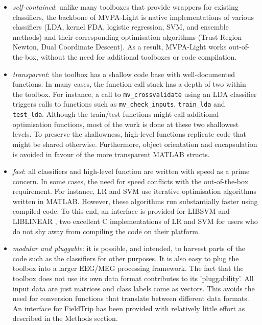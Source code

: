 \documentclass[utf8]{frontiersSCNS} %
\begin{document}

\begin{itemize}
\item \textit{self-contained}: unlike many toolboxes that provide wrappers for existing classifiers, the backbone of MVPA-Light is  native implementations of various classifiers (LDA, kernel FDA, logistic regression, SVM, and ensemble methods) and their corresponding optimisation algorithms (Trust-Region Newton, Dual Coordinate Descent). As a result, MVPA-Light works out-of-the-box, without the need for additional toolboxes or  code compilation.
\item \textit{transparent}: the toolbox has a shallow code base with well-documented functions. In many cases, the function call stack has a depth of two within the toolbox. For instance, a call to \texttt{mv\_crossvalidate} using an LDA classifier triggers calls to functions such as  \texttt{mv\_check\_inputs}, \texttt{train\_lda} and \texttt{test\_lda}. Although the train/test functions might call additional optimisation functions, most of the work is done at these two shallowest levels. To preserve the shallowness, high-level functions replicate code that might be shared otherwise. Furthermore, object orientation and encapsulation is avoided in favour of the more transparent MATLAB structs.
\item \textit{fast}: all classifiers and high-level function are written with speed as a prime concern. In some cases, the need for speed conflicts with the out-of-the-box requirement. For instance, LR and SVM use iterative optimisation algorithms written in MATLAB. However, these algorithms run substantially faster using compiled code. To this end, an interface is provided for LIBSVM \citep{Chang2011LIBSVM:Machines} and LIBLINEAR \citep{Fan2008}, two excellent C implementations of LR and SVM for users who do not shy away from compiling the code on their platform.
\item \textit{modular and pluggable}: it is possible, and intended, to harvest parts of the code such as the classifiers for other purposes. It is also easy to plug the toolbox into a larger EEG/MEG processing framework. The fact that the toolbox does not use its own data format contributes to its 'pluggability'. All input data are just matrices and class labels come as vectors. This avoids the need for conversion functions that translate between different data formats. An interface for FieldTrip \citep{Oostenveld2011} has been provided with relatively little effort as described in the Methods section.

\end{itemize}
\end{document}
